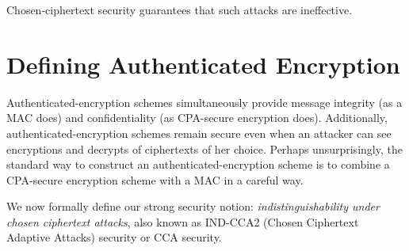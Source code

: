 \documentclass[
  letterpaper,
]{scrbook}
\theoremstyle{definition}
\theoremstyle{plain}
\theoremstyle{plain}
\theoremstyle{remark}
\begin{document}
Chosen-ciphertext security guarantees that such attacks are ineffective.

\section{Defining Authenticated
Encryption}\label{defining-authenticated-encryption}

Authenticated-encryption schemes simultaneously provide message
integrity (as a MAC does) and confidentiality (as CPA-secure encryption
does). Additionally, authenticated-encryption schemes remain secure even
when an attacker can see encryptions and decrypts of ciphertexts of her
choice. Perhaps unsurprisingly, the standard way to construct an
authenticated-encryption scheme is to combine a CPA-secure encryption
scheme with a MAC in a careful way.

We now formally define our strong security notion:
\emph{indistinguishability under chosen ciphertext attacks}, also known
as IND-CCA2 (Chosen Ciphertext Adaptive Attacks) security or CCA
security.
\end{document}
